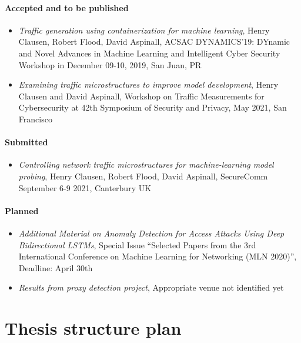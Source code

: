 \documentclass[a4paper,12pt,twoside]{article}
\begin{document}
\paragraph{Accepted and to be published}
\begin{itemize}
\item \textit{Traffic generation using containerization for machine learning}, Henry Clausen, Robert Flood, David Aspinall, ACSAC DYNAMICS'19: DYnamic and Novel Advances in Machine Learning and Intelligent Cyber Security Workshop in December 09-10, 2019, San Juan, PR
\item \textit{Examining traffic microstructures to improve model development}, Henry Clausen and David Aspinall, Workshop on Traffic Measurements for Cybersecurity at 42th Symposium of Security and Privacy, May 2021, San Francisco
\end{itemize}

\paragraph{Submitted}
\begin{itemize}
\item \textit{Controlling network traffic microstructures for machine-learning model probing}, Henry Clausen, Robert Flood, David Aspinall, SecureComm September 6-9 2021, Canterbury UK
\end{itemize}

\paragraph{Planned}
\begin{itemize}
\item \textit{Additional Material on  Anomaly Detection for Access Attacks Using Deep Bidirectional LSTMs}, Special Issue ``Selected Papers from the 3rd International Conference on Machine Learning for Networking (MLN 2020)'', Deadline: April 30th
\item \textit{Results from proxy detection project}, Appropriate venue not identified yet
\end{itemize}

\section{Thesis structure plan}
\end{document}
